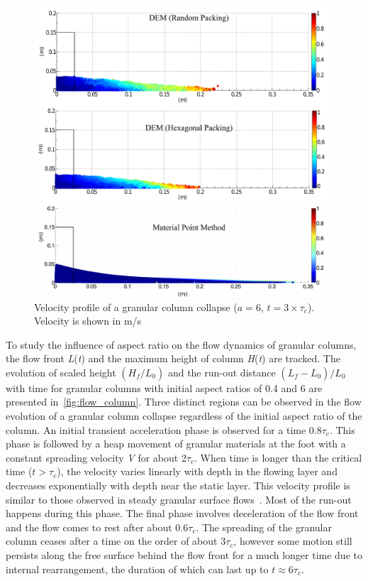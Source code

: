 \begin{figure}[tbhp]
\centering
\includegraphics[width=\textwidth]{a6f}
\caption[Velocity profile of a granular column collapse ($a = 6$, 
$t=3\times\tau_c$)]{Velocity profile of a granular column collapse ($a = 6$, 
$t=3\times\tau_c$). Velocity is shown in m/s}
\label{fig:a6f}
\end{figure}

To study the influence of aspect ratio on the flow dynamics of granular 
columns, the flow front \textit{L}(\textit{t}) and the maximum height of column 
\textit{H}(\textit{t}) are tracked. The evolution of scaled height 
$(H_{\textit{f}}/L_{\textit{0}})$ and the run-out distance 
$(L_{\textit{f}}-L_{\textit{0}})/L_{\textit{0}}$ with time for granular columns 
with initial aspect ratios of 0.4 and 6 are presented 
in~\cref{fig:flow_column}. Three distinct regions can be observed in the flow 
evolution of a granular column collapse regardless of the initial aspect ratio 
of the column. An initial transient acceleration phase is observed for a time 
0.8$\tau_{c}$. 
This phase is followed by a heap movement of granular materials at the foot 
with a constant spreading velocity \textit{V} for about 2$\tau_{c}$. When time 
is longer than the critical time ($t > \tau_{c}$), the velocity varies linearly 
with depth in the flowing layer and decreases exponentially with depth near the 
static layer. 
This velocity profile is similar to those observed in steady granular surface 
flows~\citep{Lajeunesse2004}. Most of the run-out happens during this phase. 
The final phase involves deceleration of the flow front and the flow comes to 
rest after about 0.6$\tau_{c}$. The spreading of the granular column ceases 
after a time on the order of about 3$\tau_{c}$, however some motion still 
persists along the free surface behind the flow front for a much longer time 
due to internal rearrangement, the duration of which can last up to $\textit{t} 
\approx 6\tau_{c}$. 

